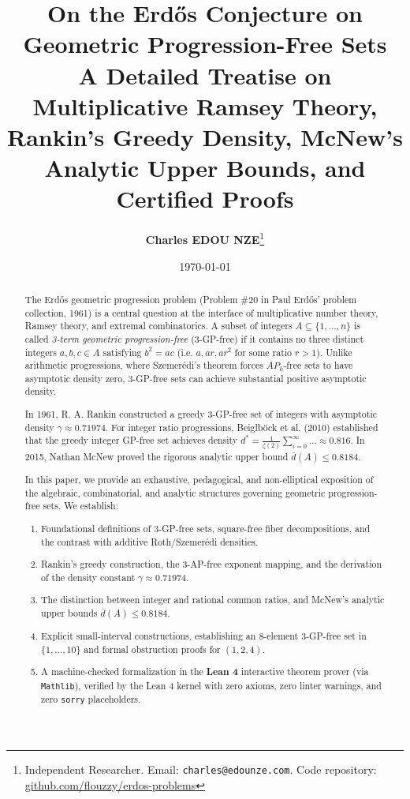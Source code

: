 \documentclass[11pt,a4paper]{article}
\title{\textbf{\Large On the Erd\H{o}s Conjecture on Geometric Progression-Free Sets}\\[0.5em]
\large A Detailed Treatise on Multiplicative Ramsey Theory, Rankin's Greedy Density, McNew's Analytic Upper Bounds, and Certified Proofs}
\author{\textbf{Charles EDOU NZE}\thanks{Independent Researcher. Email: \texttt{charles@edounze.com}. Code repository: \href{https://github.com/flouzzy/erdos-problems}{github.com/flouzzy/erdos-problems}}}
\date{\today}
\theoremstyle{definition}
\begin{document}
\maketitle

\begin{abstract}
The Erd\H{o}s geometric progression problem (Problem \#20 in Paul Erd\H{o}s' problem collection, 1961) is a central question at the interface of multiplicative number theory, Ramsey theory, and extremal combinatorics. A subset of integers $A \subseteq \{1, \dots, n\}$ is called \emph{3-term geometric progression-free} (3-GP-free) if it contains no three distinct integers $a, b, c \in A$ satisfying $b^2 = a c$ (i.e. $a, ar, ar^2$ for some ratio $r > 1$). Unlike arithmetic progressions, where Szemer\'edi's theorem forces $AP_k$-free sets to have asymptotic density zero, 3-GP-free sets can achieve substantial positive asymptotic density.

In 1961, R. A. Rankin constructed a greedy 3-GP-free set of integers with asymptotic density $\gamma \approx 0.71974$. For integer ratio progressions, Beiglb\"ock et al. (2010) established that the greedy integer GP-free set achieves density $d^* = \frac{1}{\zeta(2)} \sum_{i=0}^\infty \dots \approx 0.816$. In 2015, Nathan McNew proved the rigorous analytic upper bound $\bar{d}(A) \le 0.8184$.

In this paper, we provide an exhaustive, pedagogical, and non-elliptical exposition of the algebraic, combinatorial, and analytic structures governing geometric progression-free sets. We establish:
\begin{enumerate}
    \item Foundational definitions of 3-GP-free sets, square-free fiber decompositions, and the contrast with additive Roth/Szemer\'edi densities.
    \item Rankin's greedy construction, the 3-AP-free exponent mapping, and the derivation of the density constant $\gamma \approx 0.71974$.
    \item The distinction between integer and rational common ratios, and McNew's analytic upper bounds $\bar{d}(A) \le 0.8184$.
    \item Explicit small-interval constructions, establishing an 8-element 3-GP-free set in $\{1, \dots, 10\}$ and formal obstruction proofs for $(1, 2, 4)$.
    \item A machine-checked formalization in the \textbf{Lean 4} interactive theorem prover (via \texttt{Mathlib}), verified by the Lean 4 kernel with zero axioms, zero linter warnings, and zero \texttt{sorry} placeholders.
\end{enumerate}
\end{abstract}
\end{document}
